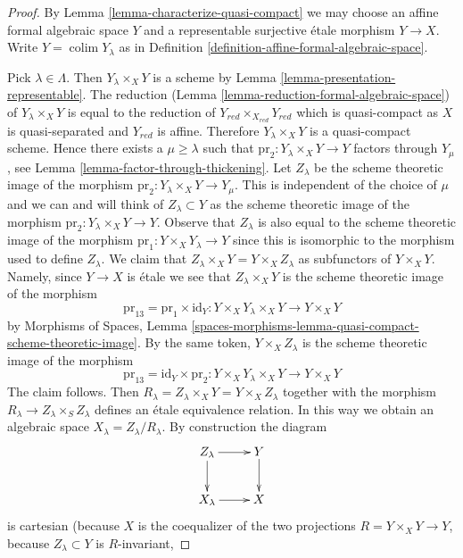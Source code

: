 \documentclass{stacks-project}
\theoremstyle{plain}
\theoremstyle{definition}
\theoremstyle{remark}
\numberwithin{equation}{subsection}
\def\colim{\mathop{\mathrm{colim}}\nolimits}
\begin{document}
\begin{proof}
By Lemma \ref{lemma-characterize-quasi-compact} we may choose an
affine formal algebraic space $Y$ and a representable surjective
\'etale morphism $Y \to X$. Write $Y = \colim Y_\lambda$ as in
Definition \ref{definition-affine-formal-algebraic-space}.

\medskip\noindent
Pick $\lambda \in \Lambda$. Then $Y_\lambda \times_X Y$ is a scheme by
Lemma \ref{lemma-presentation-representable}. The reduction
(Lemma \ref{lemma-reduction-formal-algebraic-space})
of $Y_\lambda \times_X Y$ is equal to the reduction of
$Y_{red} \times_{X_{red}} Y_{red}$ which is quasi-compact as $X$
is quasi-separated and $Y_{red}$ is affine.
Therefore $Y_\lambda \times_X Y$ is a quasi-compact scheme.
Hence there exists a $\mu \geq \lambda$ such that
$\text{pr}_2 : Y_\lambda \times_X Y \to Y$ factors
through $Y_\mu$, see Lemma \ref{lemma-factor-through-thickening}.
Let $Z_\lambda$ be the scheme theoretic image of the morphism
$\text{pr}_2 : Y_\lambda \times_X Y \to Y_\mu$.
This is independent of the choice of $\mu$ and we can and
will think of $Z_\lambda \subset Y$ as the scheme theoretic
image of the morphism $\text{pr}_2 : Y_\lambda \times_X Y \to Y$.
Observe that $Z_\lambda$ is also equal to the scheme theoretic image
of the morphism $\text{pr}_1 : Y \times_X Y_\lambda \to Y$ since
this is isomorphic to the morphism used to define $Z_\lambda$.
We claim that $Z_\lambda \times_X Y = Y \times_X Z_\lambda$ as subfunctors
of $Y \times_X Y$. Namely, since $Y \to X$ is \'etale we see that
$Z_\lambda \times_X Y$ is the scheme theoretic image of the morphism
$$
\text{pr}_{13} = \text{pr}_1 \times \text{id}_Y :
Y \times_X Y_\lambda \times_X Y \longrightarrow Y \times_X Y
$$
by Morphisms of Spaces, Lemma
\ref{spaces-morphisms-lemma-quasi-compact-scheme-theoretic-image}.
By the same token, $Y \times_X Z_\lambda$ is the scheme theoretic image
of the morphism
$$
\text{pr}_{13} = \text{id}_Y \times \text{pr}_2 : 
Y \times_X Y_\lambda \times_X Y \longrightarrow Y \times_X Y
$$
The claim follows. Then
$R_\lambda = Z_\lambda \times_X Y = Y \times_X Z_\lambda$
together with the morphism $R_\lambda \to Z_\lambda \times_S Z_\lambda$
defines an \'etale equivalence relation. In this way we obtain an algebraic
space $X_\lambda = Z_\lambda/R_\lambda$. By construction the diagram
$$
\xymatrix{
Z_\lambda \ar[r] \ar[d] & Y \ar[d] \\
X_\lambda \ar[r] & X
}
$$
is cartesian (because $X$ is the coequalizer of the two projections
$R = Y \times_X Y \to Y$, because $Z_\lambda \subset Y$ is $R$-invariant,

\end{proof}
\end{document}
